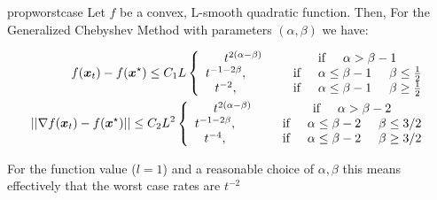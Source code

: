 \documentclass{article}
\begin{document}
\begin{restatable}{prop}{worstcase}
Let $f$ be a convex, L-smooth quadratic function. Then, For the Generalized Chebyshev Method with parameters $(\alpha,\beta)$ we have:

\begin{align}
 f({\boldsymbol x}_t)-f({\boldsymbol x}^\star) \leq C_1L\left\{
    \begin{array}{cc}
           t^{2(\alpha-\beta)} &\text{if} \hspace{0.5 cm} \alpha>\beta-1 \\
         t^{-1-2\beta}, \hspace{1 cm} &\text{if} \hspace{0.5 cm} \alpha\leq \beta-1\hspace{0.5 cm} \beta\leq \frac{1}{2}\\
         t^{-2}, \hspace{1 cm} &\text{if} \hspace{0.5 cm} \alpha\leq\beta-1\hspace{0.5 cm} \beta\geq \frac{1}{2} 
    \end{array}
    \right .\\
    ||\nabla f({\boldsymbol x}_t)-f({\boldsymbol x}^\star)||\leq C_2L^2\left\{
    \begin{array}{cc}
           t^{2(\alpha-\beta)} &\text{if} \hspace{0.5 cm} \alpha>\beta-2 \\
         t^{-1-2\beta}, \hspace{1 cm} &\text{if} \hspace{0.5 cm} \alpha\leq \beta-2\hspace{0.5 cm} \beta\leq 3/2\\
         t^{-4}, \hspace{1 cm} &\text{if} \hspace{0.5 cm} \alpha\leq\beta-2\hspace{0.5 cm} \beta\geq 3/2
    \end{array}
    \right . 
\end{align}
\end{restatable}


For the function value ($l=1$) and a reasonable choice of $\alpha,\beta$ this means effectively that the worst case rates are $t^{-2}$ 
\end{document}
